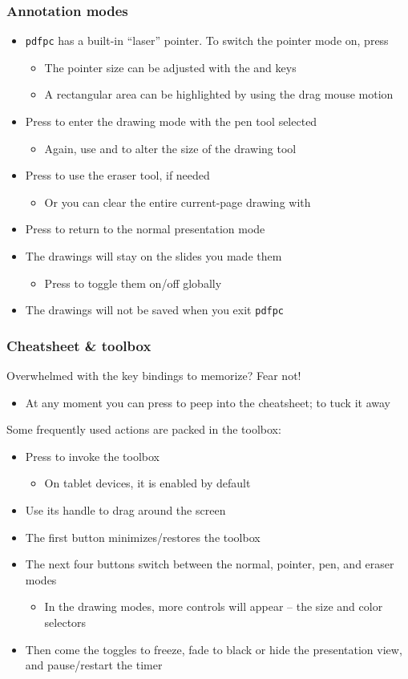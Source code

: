 \documentclass{beamer}
\newcommand{\singleitem}[1]{\begin{itemize}\item #1\end{itemize}}
\newcommand{\pdfpc}{\texttt{pdfpc}\xspace}
\begin{document}
\begin{frame}
  \frametitle{Annotation modes}
  \begin{itemize}
    \item \pdfpc has a built-in ``laser'' pointer. To switch the pointer
      mode on, press 
      \begin{itemize}
        \item The pointer size can be adjusted with the \keys{{+}} and \keys{-}
          keys
        \item A rectangular area can be highlighted by using the drag mouse
          motion
      \end{itemize}
    \item Press  to enter the drawing mode with the pen tool selected
      \singleitem{Again, use \keys{{+}} and \keys{-} to alter the size of the
        drawing tool}
    \item Press  to use the eraser tool, if needed
      \singleitem{Or you can clear the entire current-page drawing with
        \keys{C}}
    \item Press  to return to the normal presentation mode
    \item The drawings will stay on the slides you made them
      \singleitem{Press  to toggle them on/off globally}
    \item The drawings will \alert{not} be saved when you exit \pdfpc
  \end{itemize}
\end{frame}

\begin{frame}
  \frametitle{Cheatsheet \& toolbox}
  Overwhelmed with the key bindings to memorize? Fear not!

  \singleitem{At any moment you can press  to peep into the cheatsheet;
    \keys{esc} to tuck it away}

  Some frequently used actions are packed in the toolbox:

  \begin{itemize}
    \item Press  to invoke the toolbox
      \singleitem{On tablet devices, it is enabled by default}
    \item Use its handle to drag around the screen
    \item The first button minimizes/restores the toolbox
    \item The next four buttons switch between the normal, pointer, pen, and
      eraser modes
      \singleitem{In the drawing modes, more controls will appear -- the size
        and color selectors}
    \item Then come the toggles to freeze, fade to black or hide the
      presentation view, and pause/restart the timer
  \end{itemize}
\end{frame}
\end{document}
